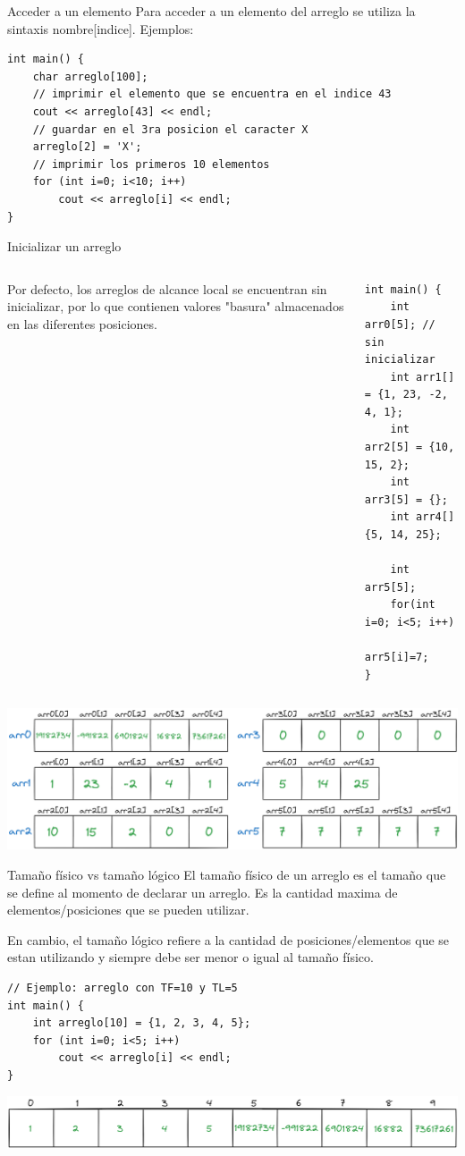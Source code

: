 \documentclass[12pt]{beamer}
\begin{document}
\begin{frame}[fragile]{Acceder a un elemento}
    Para acceder a un elemento del arreglo se utiliza la sintaxis \alert{nombre[indice]}. Ejemplos: \\
\begin{lstlisting}
int main() {
    char arreglo[100];
    // imprimir el elemento que se encuentra en el indice 43
    cout << arreglo[43] << endl;
    // guardar en el 3ra posicion el caracter X
    arreglo[2] = 'X';
    // imprimir los primeros 10 elementos
    for (int i=0; i<10; i++)
        cout << arreglo[i] << endl;
}
\end{lstlisting}
\end{frame}

\begin{frame}[fragile]{Inicializar un arreglo}
    \begin{columns}
        Por defecto, los arreglos de alcance local se encuentran sin inicializar, por lo que contienen valores "basura" almacenados en las diferentes posiciones.
        \begin{lstlisting}[basicstyle=\tiny]
int main() {
    int arr0[5]; // sin inicializar
    int arr1[] = {1, 23, -2, 4, 1};
    int arr2[5] = {10, 15, 2};
    int arr3[5] = {};
    int arr4[] {5, 14, 25};

    int arr5[5];
    for(int i=0; i<5; i++)
        arr5[i]=7;
}
\end{lstlisting}
        \end{columns}
        \includegraphics[width=\textwidth]{arrays.png}
\end{frame}

\begin{frame}[fragile]{Tamaño físico vs tamaño lógico}
    El \alert{tamaño físico} de un arreglo es el tamaño que se define al momento de declarar un arreglo. Es la cantidad maxima de elementos/posiciones que se pueden utilizar.
    
    \medskip
    
    En cambio, el \alert{tamaño lógico} refiere a la cantidad de posiciones/elementos que se estan utilizando y siempre \alert{debe ser menor o igual al tamaño físico}.

\begin{lstlisting}[]
// Ejemplo: arreglo con TF=10 y TL=5
int main() {
    int arreglo[10] = {1, 2, 3, 4, 5};
    for (int i=0; i<5; i++)
        cout << arreglo[i] << endl;
}
\end{lstlisting}
    \includegraphics[width=\textwidth]{tamlogico.png}
\end{frame}
\end{document}
